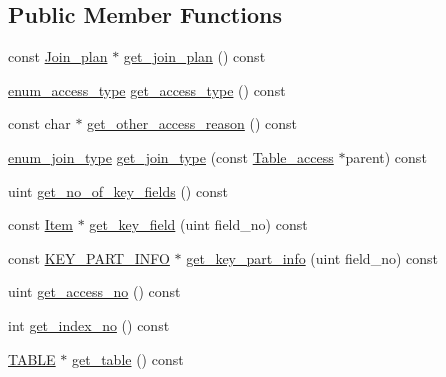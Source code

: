 \subsection*{Public Member Functions}
\begin{DoxyCompactItemize}
\item 
const \mbox{\hyperlink{classAQP_1_1Join__plan}{Join\+\_\+plan}} $\ast$ \mbox{\hyperlink{classAQP_1_1Table__access_a3e8216cc34a55ab3b132e36a4809fd37}{get\+\_\+join\+\_\+plan}} () const
\item 
\mbox{\hyperlink{namespaceAQP_a4aaae4a1dc295a865368c9822d4dd0a5}{enum\+\_\+access\+\_\+type}} \mbox{\hyperlink{classAQP_1_1Table__access_aa0f6bf2c2cdc429e39313adcec8745e3}{get\+\_\+access\+\_\+type}} () const
\item 
const char $\ast$ \mbox{\hyperlink{classAQP_1_1Table__access_af056c478a5e8b26a90114bb44af0c1a4}{get\+\_\+other\+\_\+access\+\_\+reason}} () const
\item 
\mbox{\hyperlink{namespaceAQP_a79358adf81977651643ef6c1672e18f8}{enum\+\_\+join\+\_\+type}} \mbox{\hyperlink{classAQP_1_1Table__access_ade9e74888c7a810648a7802234aaf150}{get\+\_\+join\+\_\+type}} (const \mbox{\hyperlink{classAQP_1_1Table__access}{Table\+\_\+access}} $\ast$parent) const
\item 
uint \mbox{\hyperlink{classAQP_1_1Table__access_af85fb3397460129a42ddea12be9d3cc1}{get\+\_\+no\+\_\+of\+\_\+key\+\_\+fields}} () const
\item 
const \mbox{\hyperlink{classItem}{Item}} $\ast$ \mbox{\hyperlink{classAQP_1_1Table__access_a5160036ccc841dc61d1728f86a30bd80}{get\+\_\+key\+\_\+field}} (uint field\+\_\+no) const
\item 
const \mbox{\hyperlink{classKEY__PART__INFO}{K\+E\+Y\+\_\+\+P\+A\+R\+T\+\_\+\+I\+N\+FO}} $\ast$ \mbox{\hyperlink{classAQP_1_1Table__access_a569b503d8f970211dab3544b300bddc6}{get\+\_\+key\+\_\+part\+\_\+info}} (uint field\+\_\+no) const
\item 
uint \mbox{\hyperlink{classAQP_1_1Table__access_a157f02f305d45857fcba1274345b93f2}{get\+\_\+access\+\_\+no}} () const
\item 
int \mbox{\hyperlink{classAQP_1_1Table__access_a48078f34bde5ffd5b683e90b3cabc37b}{get\+\_\+index\+\_\+no}} () const
\item 
\mbox{\hyperlink{structTABLE}{T\+A\+B\+LE}} $\ast$ \mbox{\hyperlink{classAQP_1_1Table__access_a1b4a0ca9060c584c52274371c2d7e479}{get\+\_\+table}} () const
\item 
\mbox{\label{classAQP_1_1Table__access_ab689a0b71ded58da14e139a32324ab04}} 

\end{DoxyCompactItemize}
